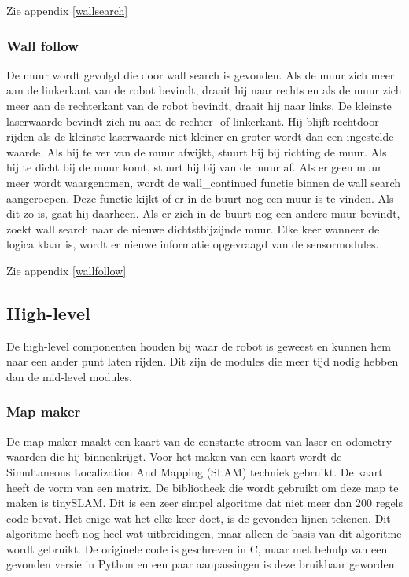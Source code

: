 \documentclass[a4paper,10pt]{article}
\begin{document}
Zie appendix \ref{wallsearch}

\subsubsection{Wall follow}
De muur wordt gevolgd die door wall search is gevonden. Als de muur zich meer aan de linkerkant van de robot bevindt, draait hij naar rechts en als de muur zich meer aan de rechterkant van de robot bevindt, draait hij naar links. De kleinste laserwaarde bevindt zich nu aan de rechter- of linkerkant. Hij blijft rechtdoor rijden als de kleinste laserwaarde niet kleiner en groter wordt dan een ingestelde waarde. Als hij te ver van de muur afwijkt, stuurt hij bij richting de muur. Als hij te dicht bij de muur komt, stuurt hij bij van de muur af. Als er geen muur meer wordt waargenomen, wordt de wall\_continued functie binnen de wall search aangeroepen. Deze functie kijkt of er in de buurt nog een muur is te vinden. Als dit zo is, gaat hij daarheen. Als er zich in de buurt nog een andere muur bevindt, zoekt wall search naar de nieuwe dichtstbijzijnde muur. Elke keer wanneer de logica klaar is, wordt er nieuwe informatie opgevraagd van de sensormodules.%

Zie appendix \ref{wallfollow}

\subsection{High-level}
De high-level componenten houden bij waar de robot is geweest en kunnen hem naar een ander punt laten rijden. Dit zijn de modules die meer tijd nodig hebben dan de mid-level modules.

\subsubsection{Map maker}
De map maker maakt een kaart van de constante stroom van laser en odometry waarden die hij binnenkrijgt. Voor het maken van een kaart wordt de Simultaneous Localization And Mapping (SLAM) techniek gebruikt. De kaart heeft de vorm van een matrix.
De bibliotheek die wordt gebruikt om deze map te maken is tinySLAM. Dit is een zeer simpel algoritme dat niet meer dan 200 regels code bevat. Het enige wat het elke keer doet, is de gevonden lijnen tekenen. Dit algoritme heeft nog heel wat uitbreidingen, maar alleen de basis van dit algoritme wordt gebruikt. De originele code is geschreven in C, maar met behulp van een gevonden versie in Python en een paar aanpassingen is deze bruikbaar geworden.
\end{document}
